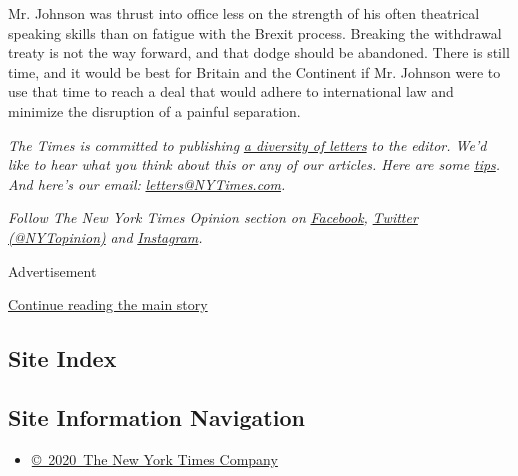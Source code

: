 Mr. Johnson was thrust into office less on the strength of his often
theatrical speaking skills than on fatigue with the Brexit process.
Breaking the withdrawal treaty is not the way forward, and that dodge
should be abandoned. There is still time, and it would be best for
Britain and the Continent if Mr. Johnson were to use that time to reach
a deal that would adhere to international law and minimize the
disruption of a painful separation.

\emph{The Times is committed to publishing}
\href{https://www.nytimes3xbfgragh.onion/2019/01/31/opinion/letters/letters-to-editor-new-york-times-women.html}{\emph{a
diversity of letters}} \emph{to the editor. We'd like to hear what you
think about this or any of our articles. Here are some}
\href{https://help.nytimes3xbfgragh.onion/hc/en-us/articles/115014925288-How-to-submit-a-letter-to-the-editor}{\emph{tips}}\emph{.
And here's our email:}
\href{mailto:letters@NYTimes.com}{\emph{letters@NYTimes.com}}\emph{.}

\emph{Follow The New York Times Opinion section on}
\href{https://www.facebookcorewwwi.onion/nytopinion}{\emph{Facebook}}\emph{,}
\href{http://twitter.com/NYTOpinion}{\emph{Twitter (@NYTopinion)}}
\emph{and}
\href{https://www.instagram.com/nytopinion/}{\emph{Instagram}}\emph{.}

Advertisement

\protect\hyperlink{after-bottom}{Continue reading the main story}

\hypertarget{site-index}{%
\subsection{Site Index}\label{site-index}}

\hypertarget{site-information-navigation}{%
\subsection{Site Information
Navigation}\label{site-information-navigation}}

\begin{itemize}
\tightlist
\item
  \href{https://help.nytimes3xbfgragh.onion/hc/en-us/articles/115014792127-Copyright-notice}{©~2020~The
  New York Times Company}
\end{itemize}

